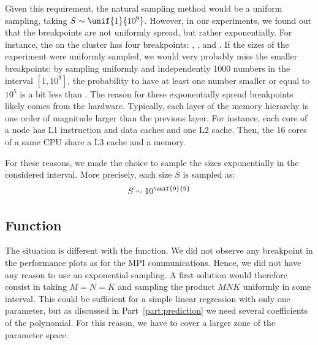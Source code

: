            Given this requirement, the natural sampling method would be a uniform sampling, taking
            \(S\sim\unif{1}{10^9}\). However, in our experiments, we found out that the breakpoints are not uniformly
            spread, but rather exponentially. For instance, the \send on the \dahu cluster has four
            breakpoints: , ,  and
            . If the sizes of the experiment were uniformly sampled, we would very probably miss
            the smaller breakpoints: by sampling uniformly and independently 1000 numbers in the interval \([1, 10^9]\),
            the probability to have at least one number smaller or equal to \(10^5\) is a bit less than
            . The reason for these exponentially spread breakpoints likely comes from the hardware.
            Typically, each layer of the memory hierarchy is one order of magnitude larger than the previous layer. For
            instance, each core of a \dahu node has  L1 instruction and data caches and one
             L2 cache. Then, the 16 cores of a same CPU share a  L3 cache and
            a  memory.

            For these reasons, we made the choice to sample the sizes exponentially in the considered interval. More
            precisely, each size $S$ is sampled as: \[S\sim10^{\unif{0}{9}}\]

        \subsection{Function \dgemm}%
        \label{sub:parameter_space:dgemm}

            The situation is different with the \dgemm function. We did not observe any breakpoint in the performance
            plots as for the MPI communications. Hence, we did not have any reason to use an exponential sampling. A
            first solution would therefore consist in taking \(M=N=K\) and sampling the product \(MNK\) uniformly in
            some interval.  This could be sufficient for a simple linear regression with only one parameter, but as
            discussed in Part~\ref{part:prediction} we need several coefficients of the polynomial. For this reason, we
            have to cover a larger zone of the parameter space.

